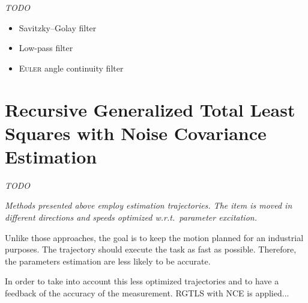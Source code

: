 \documentclass[/home/francois/latex/report/main.tex]{subfiles}
\begin{document}
\textit{TODO}

{\it
\begin{itemize}
  \item Savitzky–Golay filter
  \item Low-pass filter
  \item \textsc{Euler} angle continuity filter
\end{itemize}
}

\section{Recursive Generalized Total Least Squares with Noise Covariance Estimation}

\textit{TODO}

{\it
Methods presented above employ estimation trajectories. The item is moved in different directions and speeds optimized w.r.t.\ parameter excitation.

Unlike those approaches, the goal is to keep the motion planned for an industrial purposes. The trajectory should execute the task as fast as possible. Therefore, the parameters estimation are less likely to be accurate.

In order to take into account this less optimized trajectories and to have a feedback of the accuracy of the measurement. \ac{RGTLS} with \ac{NCE} is applied... \cite{Rhode2014}
}
\end{document}
